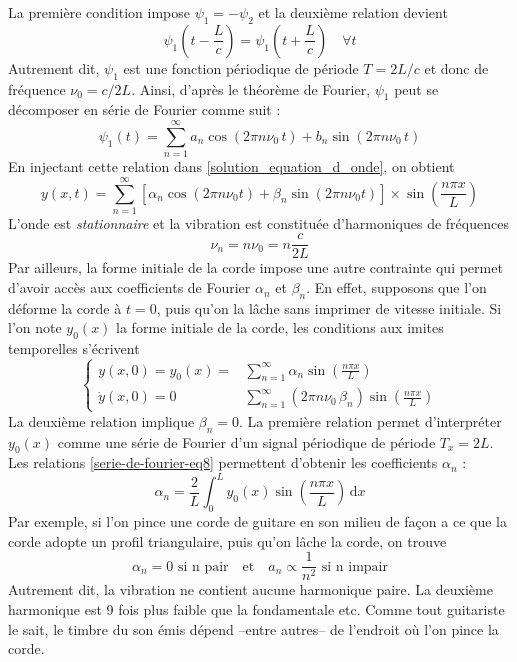 La première condition impose $\psi_{1}=-\psi_{2}$ et la deuxième relation devient 
\[
\psi_{1}\left(t-\frac{L}{c}\right)=\psi_{1}\left(t+\frac{L}{c}\right)\quad \forall t
\]
Autrement dit, $\psi_{1}$ est une fonction périodique de période \(T=2L/c\) et donc de fréquence \(\nu_0=c/2L\). Ainsi, d'après le théorème de Fourier, \(\psi_1\) peut se décomposer en série de Fourier comme suit :
\[
	\psi_1(t)=\sum_{n=1}^\infty a_n\cos(2\pi n\nu_0\,t)+b_n\sin(2\pi n\nu_0\,t)
\]
En injectant cette relation dans \eqref{solution_equation_d_onde}, on obtient 
\begin{equation}
y(x,t)=\sum_{n=1}^\infty \left[\alpha_n\cos(2\pi n\nu_0 t)+\beta_n\sin(2\pi n\nu_0t)\right]\times \sin\left(\frac{n\pi x}{L}\right)
\label{expression_de_l'onde_stationnaire}
\end{equation}
L'onde est \emph{stationnaire} et la vibration est constituée d'harmoniques de fréquences 
\[
	\nu_n=n\nu_0=n\frac{c}{2L}
\]
Par ailleurs, la forme initiale de la corde impose une autre contrainte qui permet d'avoir accès aux coefficients de Fourier $\alpha_{n}$ et $\beta_{n}$. En effet, supposons que l'on déforme la corde à \(t=0\), puis qu'on la lâche sans imprimer de vitesse initiale. Si l'on note \(y_0(x)\) la forme initiale de la corde, les conditions aux imites temporelles s'écrivent
\[
\begin{cases}
	y(x,0)=y_0(x)=&\displaystyle \sum_{n=1}^\infty \alpha_n\sin\left(\frac{n\pi x}{L}\right)\\
	\dot y(x,0)=0&\displaystyle \sum_{n=1}^\infty (2\pi n\nu_0 \,\beta_n)\sin\left(\frac{n\pi x}{L}\right)
\end{cases}
\]
La deuxième relation implique \(\beta_n=0\). La première relation permet d'interpréter \(y_0(x)\) comme une série de Fourier d'un signal périodique de période \(T_x=2L\). Les relations \eqref{serie-de-fourier-eq8} permettent d'obtenir les coefficients \(\alpha_n\) :
\[
	\alpha_n=\frac{2}{L}\int_0^L y_0(x)\sin\left(\frac{n\pi x}{L}\right)\, \mathrm{d}x
\]
Par exemple, si l'on pince une corde de guitare en son milieu de façon a ce que la corde adopte un profil triangulaire, puis qu'on lâche la corde, on trouve  
\[
	\alpha_n=0 \text{ si n pair}\quad\text{et}\quad a_n\propto \frac{1}{n^2}\text{ si n impair}
\]
Autrement dit, la vibration ne contient aucune harmonique paire. La deuxième harmonique est 9 fois plus faible que la fondamentale etc. Comme tout guitariste le sait, le timbre du son émis dépend --entre autres-- de l'endroit où l'on pince la corde.

